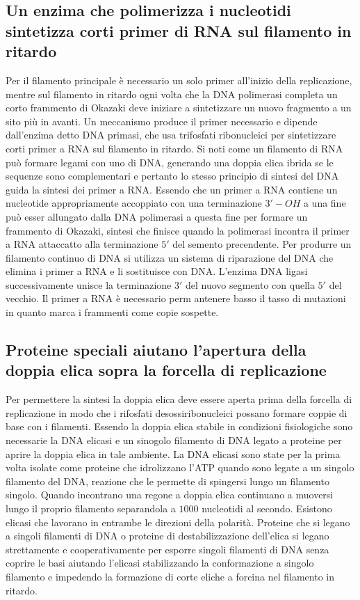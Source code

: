 \subsection{Un enzima che polimerizza i nucleotidi sintetizza corti primer di RNA sul filamento in ritardo}
Per il filamento principale \`e necessario un solo primer all'inizio della replicazione, mentre sul filamento in ritardo ogni volta che la DNA polimerasi completa un corto frammento di
Okazaki deve iniziare a sintetizzare un nuovo fragmento a un sito pi\`u in avanti. Un meccanismo produce il primer necessario e dipende dall'enzima detto DNA primasi, che usa trifosfati
ribonucleici per sintetizzare corti primer a RNA sul filamento in ritardo. Si noti come un filamento di RNA pu\`o formare legami con uno di DNA, generando una doppia elica ibrida se 
le sequenze sono complementari e pertanto lo stesso principio di sintesi del DNA guida la sintesi dei primer a RNA. Essendo che un primer a RNA contiene un nucleotide appropriamente
accoppiato con una terminazione $3'-OH$ a una fine pu\`o esser allungato dalla DNA polimerasi a questa fine per formare un frammento di Okazaki, sintesi che finisce quando la
polimerasi incontra il primer a RNA attaccatto alla terminazione $5'$ del semento precendente. Per produrre un filamento continuo di DNA si utilizza un sistema di riparazione del DNA
che elimina i primer a RNA e li sostituisce con DNA. L'enzima DNA ligasi successivamente unisce la terminazione $3'$ del nuovo segmento con quella $5'$ del vecchio. Il primer a RNA 
\`e necessario perm antenere basso il tasso di mutazioni in quanto marca i frammenti come copie sospette. 
\subsection{Proteine speciali aiutano l'apertura della doppia elica sopra la forcella di replicazione}
Per permettere la sintesi la doppia elica deve essere aperta prima della forcella di replicazione in modo che i rifosfati desossiribonucleici possano formare coppie di base con i 
filamenti. Essendo la doppia elica stabile in condizioni fisiologiche sono necessarie la DNA elicasi e un sinogolo filamento di DNA legato a proteine per aprire la doppia elica in tale
ambiente. La DNA elicasi sono state per la prima volta isolate come proteine che idrolizzano l'ATP quando sono legate a un singolo filamento del DNA, reazione che le permette di
spingersi lungo un filamento singolo. Quando incontrano una regone a doppia elica continuano a muoversi lungo il proprio filamento separandola a $1000$ nucleotidi al secondo. Esistono
elicasi che lavorano in entrambe le direzioni della polarit\`a. Proteine che si legano a singoli filamenti di DNA o proteine di destabilizzazione dell'elica si legano strettamente e
cooperativamente per esporre singoli filamenti di DNA senza coprire le basi aiutando l'elicasi stabilizzando la conformazione a singolo filamento e impedendo la formazione di corte 
eliche a forcina nel filamento in ritardo.
